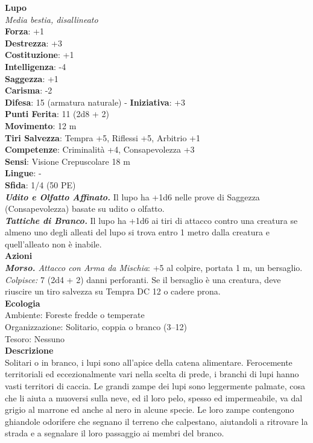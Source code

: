 \begin{multicols}{2}
\medskip\textbf{Lupo}\\
\emph{Media bestia, disallineato}\\
\textbf{Forza}: +1\\
\textbf{Destrezza}: +3\\
\textbf{Costituzione}: +1\\
\textbf{Intelligenza}: -4\\
\textbf{Saggezza}: +1\\
\textbf{Carisma}: -2\\
\textbf{Difesa}: 15 (armatura naturale) - \textbf{Iniziativa}: +3\\
\textbf{Punti Ferita}: 11 (2d8 + 2)\\
\textbf{Movimento}: 12 m\\
\textbf{Tiri Salvezza}: Tempra +5, Riflessi +5, Arbitrio +1 \\
\textbf{Competenze}: Criminalità +4, Consapevolezza +3\\
\textbf{Sensi}: Visione Crepuscolare 18 m\\
\textbf{Lingue}: -\\
\textbf{Sfida}: 1/4 (50 PE)\smallskip\\
\emph{\textbf{Udito e Olfatto Affinato.}} Il lupo ha +1d6 nelle prove di Saggezza (Consapevolezza) basate su udito o olfatto.\\
\emph{\textbf{Tattiche di Branco.}} Il lupo ha +1d6 ai tiri di attacco contro una creatura se almeno uno degli alleati del lupo si trova entro 1 metro dalla creatura e quell'alleato non è inabile.\\
\smallskip\textbf{Azioni}\\
\emph{\textbf{Morso.} Attacco con Arma da Mischia}: +5 al colpire, portata 1 m, un bersaglio.\\

\emph{Colpisce:} 7 (2d4 + 2) danni perforanti. Se il bersaglio è una creatura, deve riuscire un tiro salvezza su Tempra DC  12 o cadere prona.\\
\textbf{Ecologia}\\
Ambiente: Foreste fredde o temperate\\
Organizzazione: Solitario, coppia o branco (3–12)\\
Tesoro: Nessuno\\
\textbf{Descrizione}\\

Solitari o in branco, i lupi sono all'apice della catena alimentare. Ferocemente territoriali ed eccezionalmente vari nella scelta di prede, i branchi di lupi hanno vasti territori di caccia. Le grandi zampe dei lupi sono leggermente palmate, cosa che li aiuta a muoversi sulla neve, ed il loro pelo, spesso ed impermeabile, va dal grigio al marrone ed anche al nero in alcune specie. Le loro zampe contengono ghiandole odorifere che segnano il terreno che calpestano, aiutandoli a ritrovare la strada e a segnalare il loro passaggio ai membri del branco.\\


\end{multicols}
